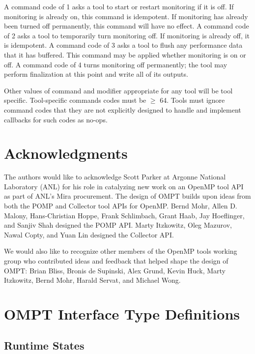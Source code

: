 \documentclass{article}
\begin{document}
\noindent
%
A command code of 1 asks a tool to start or restart monitoring if it is off. If monitoring is already on, this command is idempotent. If monitoring has already been turned off permanently, this command will have no effect. 
%
A command code of 2 asks a tool to temporarily turn monitoring off. If monitoring is already off, it is idempotent. 
% 
A command code of 3 asks a tool to flush any performance data that it has buffered. This command may be applied whether monitoring is on or off.
%
A command code of 4 turns monitoring off permanently;  the tool may perform finalization at this point and write all of its outputs. 

Other values of command  and modifier appropriate for any tool will be tool specific. Tool-specific commands codes must be $\geq$ 64. Tools must ignore command codes that they are not explicitly designed to handle and implement callbacks for such codes as no-ops.

\section*{Acknowledgments}

The authors would like to acknowledge Scott Parker at Argonne National Laboratory (ANL) for 
his role in catalyzing new work on an OpenMP tool API as part of ANL's Mira procurement.
The design of OMPT builds upon ideas from both the POMP and Collector tool APIs for OpenMP. 
Bernd Mohr, Allen D. Malony, Hans-Christian Hoppe, Frank Schlimbach, 
Grant Haab, Jay Hoeflinger, and Sanjiv Shah designed the POMP API. 
Marty Itzkowitz, Oleg Mazurov, Nawal Copty, and Yuan Lin designed the Collector API.

We would also like to recognize other members of the OpenMP tools working group who contributed ideas and feedback that helped shape the design of  OMPT: Brian Bliss, Bronis de Supinski, Alex Grund, Kevin Huck, Marty Itzkowitz, Bernd Mohr, Harald Servat, and Michael Wong.

 
 


\appendix
\clearpage


\section{OMPT Interface Type Definitions}
\label{appendix:ompt-types}
\subsection{Runtime States}
\label{appendix:ompt-types:states}
\end{document}
